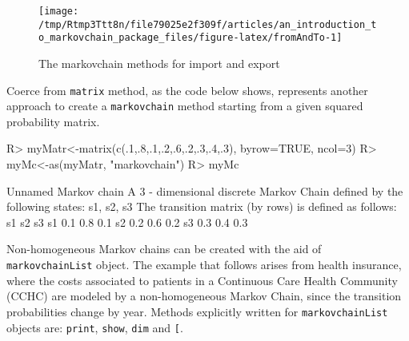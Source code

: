 \documentclass[
  nojss]{jss}
\begin{document}
\begin{CodeChunk}
\begin{figure}

{\centering \texttt{[image: /tmp/Rtmp3Ttt8n/file79025e2f309f/articles/an\_introduction\_to\_markovchain\_package\_files/figure-latex/fromAndTo-1]} 

}

\caption[The markovchain methods for import and export]{The markovchain methods for import and export}\label{fig:fromAndTo}
\end{figure}
\end{CodeChunk}

Coerce from \texttt{matrix} method, as the code below shows, represents another approach to create a \texttt{markovchain} method starting from a given squared probability matrix.

\begin{CodeChunk}

\begin{CodeInput}
R> myMatr<-matrix(c(.1,.8,.1,.2,.6,.2,.3,.4,.3), byrow=TRUE, ncol=3)
R> myMc<-as(myMatr, "markovchain")
R> myMc
\end{CodeInput}

\begin{CodeOutput}
Unnamed Markov chain 
 A  3 - dimensional discrete Markov Chain defined by the following states: 
 s1, s2, s3 
 The transition matrix  (by rows)  is defined as follows: 
    s1  s2  s3
s1 0.1 0.8 0.1
s2 0.2 0.6 0.2
s3 0.3 0.4 0.3
\end{CodeOutput}
\end{CodeChunk}

Non-homogeneous Markov chains can be created with the aid of \texttt{markovchainList} object. The example that follows arises from health insurance, where the costs associated to patients in a Continuous Care Health Community (CCHC) are modeled by a non-homogeneous Markov Chain, since the transition probabilities change by year. Methods explicitly written for \texttt{markovchainList} objects are: \texttt{print}, \texttt{show}, \texttt{dim} and \texttt{{[}}.
\end{document}
